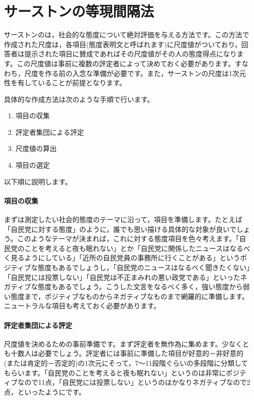 \documentclass{ltjsbook}
\begin{document}
\section{サーストンの等現間隔法}
\label{ThurstoneScale}
サーストンのは，社会的な態度について絶対評価を与える方法です。この方法で作成された尺度は，各項目(態度表明文と呼ばれます)に尺度値がついており，回答者は提示された項目に賛成であればその尺度値がその人の態度得点になります。この尺度値は事前に複数の評定者によって決めておく必要があります。すなわち，尺度を作る前の入念な準備が必要です。また，サーストンの尺度は1次元性を有していることが前提となります。

具体的な作成方法は次のような手順で行います。
\begin{enumerate}
	\item 項目の収集
	\item 評定者集団による評定
	\item 尺度値の算出
	\item 項目の選定
\end{enumerate}

以下順に説明します。
\paragraph{項目の収集}まずは測定したい社会的態度のテーマに沿って，項目を準備します。たとえば「自民党に対する態度」のように，誰でも思い描ける具体的な対象が良いでしょう。このようなテーマが決まれば，これに対する態度項目を色々考えます。「自民党のことを考えると夜も眠れない」とか「自民党に関係したニュースはなるべく見るようにしている」「近所の自民党員の事務所に行くことがある」というポジティブな態度もあるでしょうし，「自民党のニュースはなるべく聞きたくない」「自民党には投票しない」「自民党は不正まみれの悪い政党である」といったネガティブな態度もあるでしょう。こうした文言をなるべく多く，強い態度から弱い態度まで，ポジティブなものからネガティブなものまで網羅的に準備します。ニュートラルな項目も考えておく必要があります。

\paragraph{評定者集団による評定}尺度値を決めるための事前準備です。まず評定者を無作為に集めます。少なくとも十数人は必要でしょう。評定者には事前に準備した項目が好意的－非好意的(または肯定的－否定的)の1次元にそって，7〜11段階ぐらいの多段階に分類してもらいます。「自民党のことを考えると夜も眠れない」というのは非常にポジティブなので11点，「自民党には投票しない」というのはかなりネガティブなので2点，といったようにです。
\end{document}
